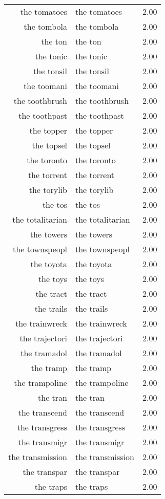 \begin{table}[ht]
\begin{tabular}{rlr}
  the tomatoes & the tomatoes & 2.00 \\ 
  the tombola & the tombola & 2.00 \\ 
  the ton & the ton & 2.00 \\ 
  the tonic & the tonic & 2.00 \\ 
  the tonsil & the tonsil & 2.00 \\ 
  the toomani & the toomani & 2.00 \\ 
  the toothbrush & the toothbrush & 2.00 \\ 
  the toothpast & the toothpast & 2.00 \\ 
  the topper & the topper & 2.00 \\ 
  the topsel & the topsel & 2.00 \\ 
  the toronto & the toronto & 2.00 \\ 
  the torrent & the torrent & 2.00 \\ 
  the torylib & the torylib & 2.00 \\ 
  the tos & the tos & 2.00 \\ 
  the totalitarian & the totalitarian & 2.00 \\ 
  the towers & the towers & 2.00 \\ 
  the townspeopl & the townspeopl & 2.00 \\ 
  the toyota & the toyota & 2.00 \\ 
  the toys & the toys & 2.00 \\ 
  the tract & the tract & 2.00 \\ 
  the trails & the trails & 2.00 \\ 
  the trainwreck & the trainwreck & 2.00 \\ 
  the trajectori & the trajectori & 2.00 \\ 
  the tramadol & the tramadol & 2.00 \\ 
  the tramp & the tramp & 2.00 \\ 
  the trampoline & the trampoline & 2.00 \\ 
  the tran & the tran & 2.00 \\ 
  the transcend & the transcend & 2.00 \\ 
  the transgress & the transgress & 2.00 \\ 
  the transmigr & the transmigr & 2.00 \\ 
  the transmission & the transmission & 2.00 \\ 
  the transpar & the transpar & 2.00 \\ 
  the traps & the traps & 2.00 \\ 

\end{tabular}
\end{table}
